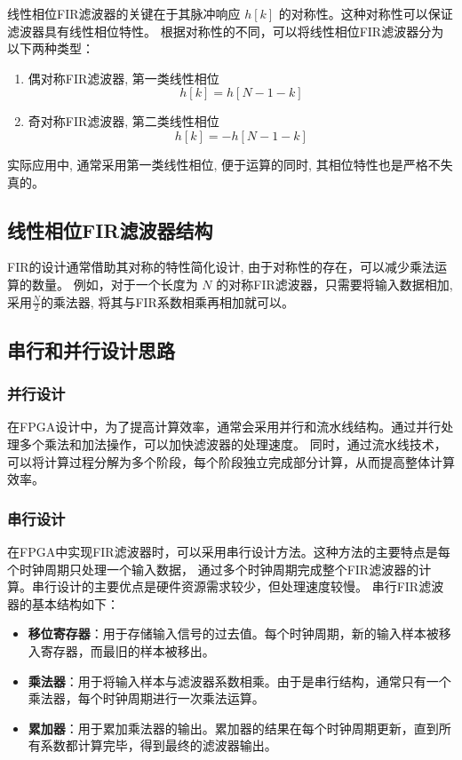 \documentclass{article}
\begin{document}
线性相位FIR滤波器的关键在于其脉冲响应 $h[k]$ 的对称性。这种对称性可以保证滤波器具有线性相位特性。
根据对称性的不同，可以将线性相位FIR滤波器分为以下两种类型：
\begin{enumerate}
    \item 偶对称FIR滤波器, 第一类线性相位
    \begin{equation}
    h[k] = h[N-1-k]
    \end{equation}
    
    \item 奇对称FIR滤波器, 第二类线性相位
    \begin{equation}
    h[k] = -h[N-1-k]
    \end{equation}
\end{enumerate}
实际应用中, 通常采用第一类线性相位, 便于运算的同时, 其相位特性也是严格不失真的。
\subsection*{线性相位FIR滤波器结构}
FIR的设计通常借助其对称的特性简化设计, 由于对称性的存在，可以减少乘法运算的数量。
例如，对于一个长度为 $N$ 的对称FIR滤波器，只需要将输入数据相加, 采用$\frac{N}{2}$的乘法器, 将其与FIR系数相乘再相加就可以。
\subsection*{串行和并行设计思路}
\subsubsection*{并行设计}
在FPGA设计中，为了提高计算效率，通常会采用并行和流水线结构。通过并行处理多个乘法和加法操作，可以加快滤波器的处理速度。
同时，通过流水线技术，可以将计算过程分解为多个阶段，每个阶段独立完成部分计算，从而提高整体计算效率。\\
\subsubsection*{串行设计}
在FPGA中实现FIR滤波器时，可以采用串行设计方法。这种方法的主要特点是每个时钟周期只处理一个输入数据，
通过多个时钟周期完成整个FIR滤波器的计算。串行设计的主要优点是硬件资源需求较少，但处理速度较慢。
串行FIR滤波器的基本结构如下：
\begin{itemize}
    \item \textbf{移位寄存器}：用于存储输入信号的过去值。每个时钟周期，新的输入样本被移入寄存器，而最旧的样本被移出。
    \item \textbf{乘法器}：用于将输入样本与滤波器系数相乘。由于是串行结构，通常只有一个乘法器，每个时钟周期进行一次乘法运算。
    \item \textbf{累加器}：用于累加乘法器的输出。累加器的结果在每个时钟周期更新，直到所有系数都计算完毕，得到最终的滤波器输出。
\end{itemize}
\end{document}
